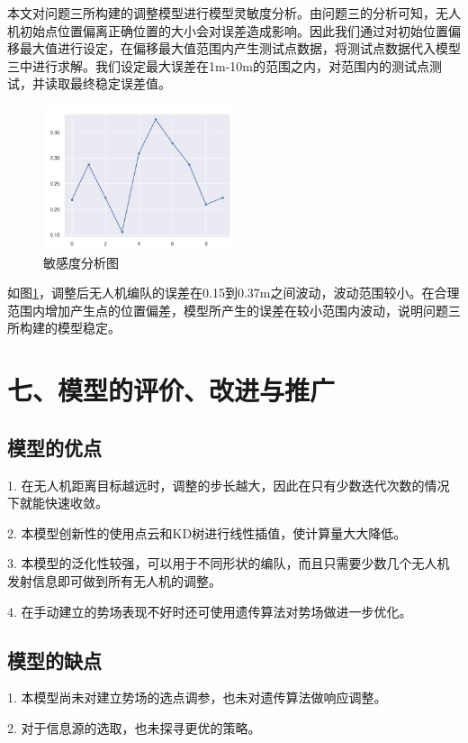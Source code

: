 \documentclass{my_paper}
\begin{document}
本文对问题三所构建的调整模型进行模型灵敏度分析。由问题三的分析可知，无人机初始点位置偏离正确位置的大小会对误差造成影响。因此我们通过对初始位置偏移最大值进行设定，在偏移最大值范围内产生测试点数据，将测试点数据代入模型三中进行求解。我们设定最大误差在1m-10m的范围之内，对范围内的测试点测试，并读取最终稳定误差值。

\begin{figure}[h]
    \centering
    \includegraphics[width=0.5\textwidth]{mingandu.jpg}
    \caption{敏感度分析图}
    \label{lingmindu}
\end{figure}

如图\ref{lingmindu}，调整后无人机编队的误差在0.15到0.37m之间波动，波动范围较小。在合理范围内增加产生点的位置偏差，模型所产生的误差在较小范围内波动，说明问题三所构建的模型稳定。




\section{七、模型的评价、改进与推广}


\subsection{模型的优点}
1. 在无人机距离目标越远时，调整的步长越大，因此在只有少数迭代次数的情况下就能快速收敛。

2. 本模型创新性的使用点云和KD树进行线性插值，使计算量大大降低。

3. 本模型的泛化性较强，可以用于不同形状的编队，而且只需要少数几个无人机发射信息即可做到所有无人机的调整。

4. 在手动建立的势场表现不好时还可使用遗传算法对势场做进一步优化。

\subsection{模型的缺点}
1. 本模型尚未对建立势场的选点调参，也未对遗传算法做响应调整。

2. 对于信息源的选取，也未探寻更优的策略。
\end{document}
